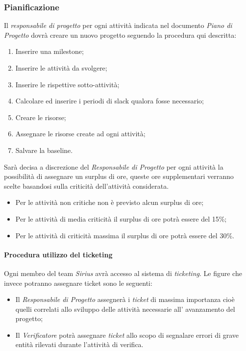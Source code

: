 \subsubsection{Pianificazione}
Il \textit{responsabile di progetto} per ogni attività indicata nel documento \textit{Piano di Progetto} dovrà creare un nuovo progetto seguendo la procedura qui descritta:

\begin{enumerate}
\item Inserire una milestone;
\item Inserire le attività da svolgere;
\item Inserire le rispettive sotto-attività;
\item Calcolare ed inserire i periodi di slack qualora fosse necessario;
\item Creare le risorse;
\item Assegnare le risorse create ad ogni attività;
\item Salvare la baseline.
\end{enumerate}

Sarà decisa a discrezione del \textit{Responsabile di Progetto} per ogni attività la possibilità di assegnare un surplus di ore, queste ore supplementari verranno scelte basandosi sulla criticità dell'attività considerata. 
\begin{itemize}
\item Per le attività non critiche non è previsto alcun surplus di ore;
\item Per le attività di media criticità il surplus di ore potrà essere del 15\%;
\item Per le attività di criticità massima il surplus di ore potrà essere del 30\%.
\end{itemize}
\paragraph{Procedura utilizzo del ticketing}
Ogni membro del team \textit{Sirius} avrà accesso al sistema di \textit{ticketing}. Le figure che invece potranno assegnare ticket sono le seguenti:

\begin{itemize}
\item Il \textit{Responsabile di Progetto} assegnerà i \textit{ticket} di massima importanza cioè quelli correlati allo sviluppo delle attività necessarie all' avanzamento del progetto;
\item Il \textit{Verificatore} potrà assegnare \textit{ticket} allo scopo di segnalare errori di grave entità rilevati durante l'attività di verifica.
\end{itemize}

